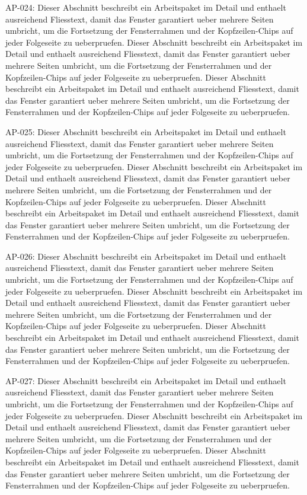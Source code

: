 \documentclass[type=report,theme=light,language=de]{semio}
\begin{document}
\begin{Table}[title=Lange Tabelle]
AP-024: Dieser Abschnitt beschreibt ein Arbeitspaket im Detail und enthaelt ausreichend Fliesstext, damit das Fenster garantiert ueber mehrere Seiten umbricht, um die Fortsetzung der Fensterrahmen und der Kopfzeilen-Chips auf jeder Folgeseite zu ueberpruefen. Dieser Abschnitt beschreibt ein Arbeitspaket im Detail und enthaelt ausreichend Fliesstext, damit das Fenster garantiert ueber mehrere Seiten umbricht, um die Fortsetzung der Fensterrahmen und der Kopfzeilen-Chips auf jeder Folgeseite zu ueberpruefen. Dieser Abschnitt beschreibt ein Arbeitspaket im Detail und enthaelt ausreichend Fliesstext, damit das Fenster garantiert ueber mehrere Seiten umbricht, um die Fortsetzung der Fensterrahmen und der Kopfzeilen-Chips auf jeder Folgeseite zu ueberpruefen. 

AP-025: Dieser Abschnitt beschreibt ein Arbeitspaket im Detail und enthaelt ausreichend Fliesstext, damit das Fenster garantiert ueber mehrere Seiten umbricht, um die Fortsetzung der Fensterrahmen und der Kopfzeilen-Chips auf jeder Folgeseite zu ueberpruefen. Dieser Abschnitt beschreibt ein Arbeitspaket im Detail und enthaelt ausreichend Fliesstext, damit das Fenster garantiert ueber mehrere Seiten umbricht, um die Fortsetzung der Fensterrahmen und der Kopfzeilen-Chips auf jeder Folgeseite zu ueberpruefen. Dieser Abschnitt beschreibt ein Arbeitspaket im Detail und enthaelt ausreichend Fliesstext, damit das Fenster garantiert ueber mehrere Seiten umbricht, um die Fortsetzung der Fensterrahmen und der Kopfzeilen-Chips auf jeder Folgeseite zu ueberpruefen. 

AP-026: Dieser Abschnitt beschreibt ein Arbeitspaket im Detail und enthaelt ausreichend Fliesstext, damit das Fenster garantiert ueber mehrere Seiten umbricht, um die Fortsetzung der Fensterrahmen und der Kopfzeilen-Chips auf jeder Folgeseite zu ueberpruefen. Dieser Abschnitt beschreibt ein Arbeitspaket im Detail und enthaelt ausreichend Fliesstext, damit das Fenster garantiert ueber mehrere Seiten umbricht, um die Fortsetzung der Fensterrahmen und der Kopfzeilen-Chips auf jeder Folgeseite zu ueberpruefen. Dieser Abschnitt beschreibt ein Arbeitspaket im Detail und enthaelt ausreichend Fliesstext, damit das Fenster garantiert ueber mehrere Seiten umbricht, um die Fortsetzung der Fensterrahmen und der Kopfzeilen-Chips auf jeder Folgeseite zu ueberpruefen. 

AP-027: Dieser Abschnitt beschreibt ein Arbeitspaket im Detail und enthaelt ausreichend Fliesstext, damit das Fenster garantiert ueber mehrere Seiten umbricht, um die Fortsetzung der Fensterrahmen und der Kopfzeilen-Chips auf jeder Folgeseite zu ueberpruefen. Dieser Abschnitt beschreibt ein Arbeitspaket im Detail und enthaelt ausreichend Fliesstext, damit das Fenster garantiert ueber mehrere Seiten umbricht, um die Fortsetzung der Fensterrahmen und der Kopfzeilen-Chips auf jeder Folgeseite zu ueberpruefen. Dieser Abschnitt beschreibt ein Arbeitspaket im Detail und enthaelt ausreichend Fliesstext, damit das Fenster garantiert ueber mehrere Seiten umbricht, um die Fortsetzung der Fensterrahmen und der Kopfzeilen-Chips auf jeder Folgeseite zu ueberpruefen. 


\end{Table}
\end{document}
